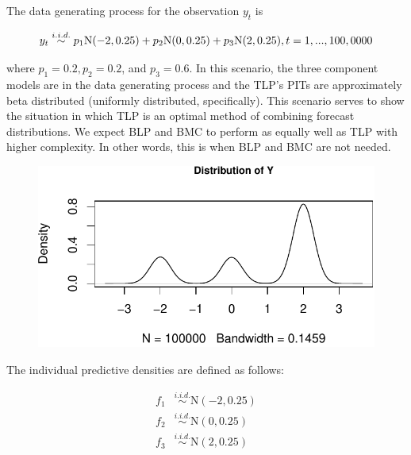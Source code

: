 \documentclass[
]{article}
\begin{document}
The data generating process for the observation \(y_t\) is

\[
y_t \overset{i.i.d.}{\sim} p_1\text{N}(-2,0.25)+p_2\text{N}(0,0.25)+p_3\text{N}(2,0.25), \\
t= 1,...,100,0000
\]

where \(p_1=0.2,p_2=0.2\), and \(p_3=0.6\). In this scenario, the three
component models are in the data generating process and the TLP's PITs
are approximately beta distributed (uniformly distributed,
specifically). This scenario serves to show the situation in which TLP
is an optimal method of combining forecast distributions. We expect BLP
and BMC to perform as equally well as TLP with higher complexity. In
other words, this is when BLP and BMC are not needed.

\begin{figure}[H]

{\centering \includegraphics{applied_blp_sim_files/figure-latex/unnamed-chunk-9-1} 

}

\end{figure}

The individual predictive densities are defined as follows:

\[
\begin{aligned}
f_{1}&\overset{i.i.d.}{\sim}\text{N}(-2,0.25)\\
f_{2}&\overset{i.i.d.}{\sim}\text{N}(0,0.25)\\
f_{3}&\overset{i.i.d.}{\sim}\text{N}(2,0.25)\\
\end{aligned}
\]
\end{document}
